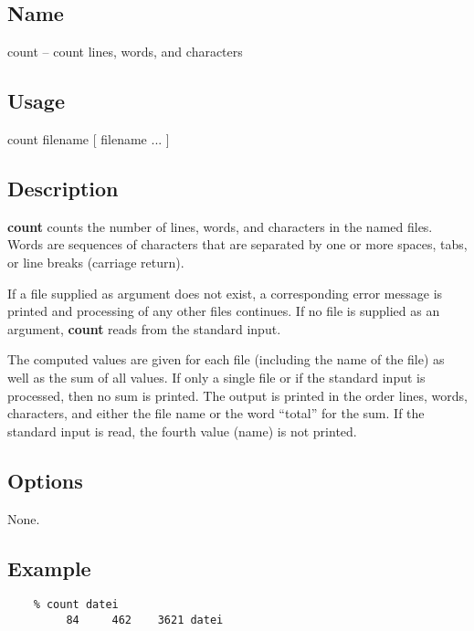 %
%

\subsection*{Name}

count -- count lines, words, and characters

\subsection*{Usage}

count filename [ filename ... ]

\subsection*{Description}

{\bf count} counts the number of lines, words, and characters in the
named files.  Words are sequences of characters that are separated by
one or more spaces, tabs, or line breaks (carriage return).

If a file supplied as argument does not exist, a corresponding error
message is printed and processing of any other files continues.
If no file is supplied as an argument, {\bf count} reads from the
standard input.

The computed values are given for each file (including the name of the
file) as well as the sum of all values.
If only a single file or if the standard input is processed, then no
sum is printed.
The output is printed in the order lines, words, characters, and
either the file name or the word ``total'' for the sum.
If the standard input is read, the fourth value (name) is not printed.

\subsection*{Options}
None.

\subsection*{Example}
\begin{verbatim}
    % count datei
         84     462    3621 datei
\end{verbatim}


